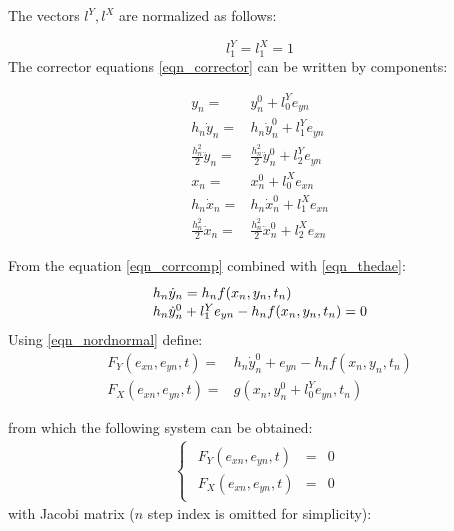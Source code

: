 \documentclass[lettersize,journal]{IEEEtran}
\begin{document}
The vectors \(l^Y,l^X\) are normalized as follows:

\begin{equation}
	\label{eqn_nordnormal}
		l^Y_1=l^X_1=1
\end{equation}
The corrector equations \eqref{eqn_corrector} can be written by components:

\begin{subequations}
	\begin{align}
		y_n =& y_n^0+l_0^Ye_{yn} \\
		h_n \dot{y}_n=& h_n \dot{y}_n^0+l_1^Ye_{yn} 	\label{eqn_corrcomp}  \\
		\frac{h_n^2}{2}\ddot{y}_n =& \frac{h_n^2}{2}\ddot{y}_n^0 +l_2^Ye_{yn} \\
		x_n =& x_n^0+l_0^Xe_{xn} \\
		h_n \dot{x}_n =& h_n \dot{x}_n^0+l_1^Xe_{xn} \\
		\frac{h_n^2}{2}\ddot{x}_n =& \frac{h_n^2}{2}\ddot{x}_n^0 + l_2^Xe_{xn} 
	\end{align}
\end{subequations}


From the equation \eqref{eqn_corrcomp} combined with \eqref{eqn_thedae}:
\begin{equation}
	\label{eqn_corrdiff}
	\def\arraystretch{1.1}
	\begin{array}{l}
		h_n\dot{y}_n =  h_nf(x_n,y_n,t_n)\\
		h_n\dot{y}_n^0+l_1^Ye_{yn} - h_nf(x_n,y_n,t_n) = 0
	\end{array}
\end{equation}
Using \eqref{eqn_nordnormal} define:
\begin{equation}
	\label{eqn_define}
	\begin{array}{rl}
		F_Y(e_{xn}, e_{yn}, t) =& h_n\dot{y}_n^0+e_{yn}-h_nf(x_n, y_n, t_n) \\
		F_X(e_{xn}, e_{yn}, t) =& g(x_n, y_n^0+l_0^Ye_{yn}, t_n)
	\end{array}
\end{equation}

\noindent from which the following system can be obtained:
\begin{equation}
	\label{eqn_system1}
	\begin{array}{c}
		\begin{cases}
			\begin{array}{rcl}
			F_Y(e_{xn}, e_{yn}, t) &=&0 \\
			F_X(e_{xn}, e_{yn}, t) &=&0 
			\end{array}
		\end{cases} 
	\end{array}
\end{equation}
\noindent with Jacobi matrix (\(n\) step index is omitted for simplicity):
\end{document}
